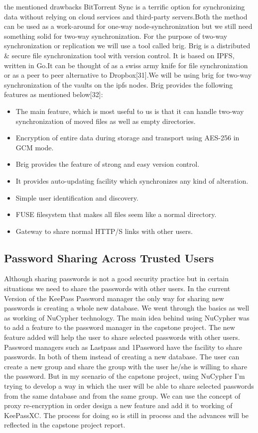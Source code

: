 \documentclass[12pt]{article}
\begin{document}
the mentioned drawbacks BitTorrent Sync is a terrific option for synchronizing data without relying on cloud services and third-party servers.Both the method can be used as a work-around for one-way node-synchronization but we still need something solid for two-way synchronization. For the purpose of two-way synchronization or replication we will use a tool called brig. Brig is a distributed & secure file synchronization tool with version control. It is based on IPFS, written in Go.It can be thought of as a swiss army knife for file synchronization or as a peer to peer alternative to Dropbox[31].We will be using brig for two-way synchronization of  the vaults on the ipfs nodes. Brig provides the following features as mentioned below[32]:
\begin{itemize}

     \item The main feature, which is most useful to us is that it can handle two-way synchronization of moved files as well as empty directories.
     \item Encryption of entire data during storage and transport using AES-256 in GCM mode. 
     \item Brig provides the feature of strong and  easy version control. 
      \item It provides auto-updating facility which synchronizes any kind of alteration. 
     \item Simple user identification and discovery.
     \item FUSE filesystem that makes all files seem like a normal directory.
     \item Gateway to share normal HTTP/S links with other users.
\end{itemize}      


\subsection{Password Sharing Across Trusted Users }


Although sharing passwords is not a good security practice but in certain situations we need to share the passwords with other users. In the current Version of the KeePass Password manager the only way for sharing new passwords is creating a whole new database. We went through the basics as well as working of NuCypher technology. The main idea behind using NuCypher was to add a feature to the password manager in the capstone project. The new feature added will help the user to share selected passwords with other users. Password managers such as Lastpass and 1Password have the facility to share passwords. In both of them instead of creating a new database. The user can create a new group and share the group with the user he/she is willing to share the password. But in my scenario of the capstone project, using NuCypher I’m trying to develop a way in which the user will be able to share selected passwords from the same database and from the same group. We can use the concept of proxy re-encryption in order design a new feature and add it to working of KeePassXC. The process for doing so is still in process and the advances will be reflected in the capstone project report.
\end{document}
